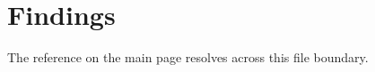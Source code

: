 \section{Findings}\label{sec:findings}
The reference on the main page resolves across this file boundary.
